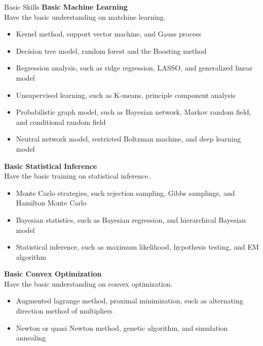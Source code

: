 \documentclass{resume} %
\begin{document}
\begin{rSection}{Basic Skills}
  {\bf Basic Machine Learning }\\
Have the basic understanding on matchine learning.
  \vspace{-3mm}
  \begin{itemize}
\item Kernel method, support vector machine, and Gauss process
\item Decision tree model, random forest and the Boosting method
\item Regression analysis, such as ridge regression, LASSO, and generalized linear model
\item Unsupervised learning,  such as K-means, principle component analysis
\item Probabilistic graph model, such as Bayesian network, Markov random field, and conditional random field
\item Neutral network model, restricted Boltzman machine, and deep learning model
  \end{itemize}
{\bf Basic Statistical Inference}\\
Have the basic training on statistical inference.
\vspace{-3mm}
\begin{itemize}
\item Monte Carlo strategies, such rejection sampling, Gibbs samplings, and Hamilton Monte Carlo
\item Bayesian statistics, such as Bayesian regression, and hierarchical Bayesian model
\item Statistical inference, such as maximum likelihood, hypothesis testing, and EM algorithm
\end{itemize}
{\bf Basic Convex Optimization}\\
Have the basic understanding on convex optimization.
\vspace{-3mm}
\begin{itemize}
\item Augmented lagrange method, proximal minimization, such as alternating direction method of multipliers
\item Newton or quasi Newton method, genetic algorithm, and simulation annealing
\end{itemize}
\end{rSection}
\end{document}
